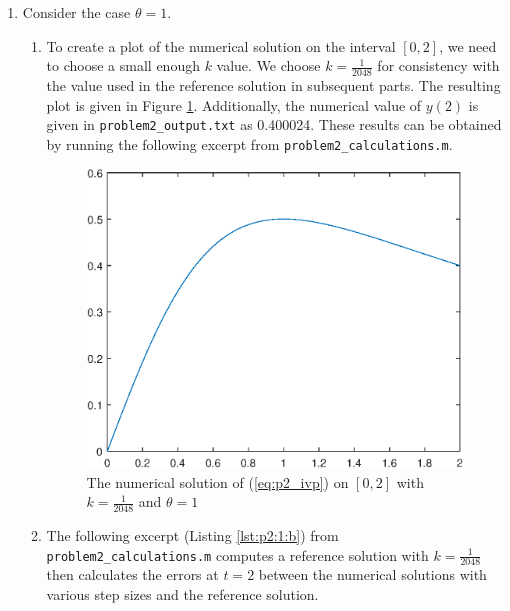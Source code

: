 \documentclass{homework}
\begin{document}
	\begin{enumerate}
		\item Consider the case $\theta = 1$.
		\begin{enumerate}[label={(\alph*)}]
			\item To create a plot of the numerical solution on the interval $[0,2]$, we need to choose a small enough $k$ value. We choose $k = \frac{1}{2048}$ for consistency with the value used in the reference solution in subsequent parts. The resulting plot is given in Figure \ref{fig:p2_part1}. Additionally, the numerical value of $y(2)$ is given in \lstinline{problem2_output.txt} as 0.400024. These results can be obtained by running the following excerpt from \lstinline{problem2_calculations.m}.
			
			
			
			\begin{figure}[h]
				\centering
				\includegraphics{p2_plot.eps}
				\caption{The numerical solution of (\ref{eq:p2_ivp}) on $[0,2]$ with $k = \frac{1}{2048}$ and $\theta = 1$}
				\label{fig:p2_part1}
			\end{figure}
			
			\item The following excerpt (Listing \ref{lst:p2:1:b}) from \lstinline{problem2_calculations.m} computes a reference solution with $k = \frac{1}{2048}$ then calculates the errors at $t=2$ between the numerical solutions with various step sizes and the reference solution.
			

\end{enumerate}
\end{enumerate}
\end{document}
